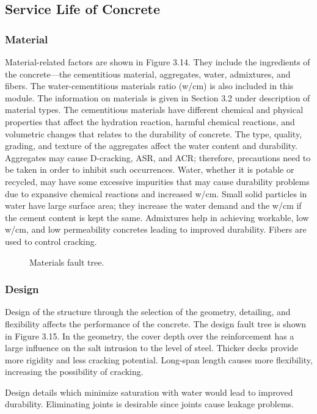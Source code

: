 \subsection{Service Life of Concrete}
\subsubsection{Material}
Material-related factors are shown in Figure 3.14. They include the ingredients of the concrete—the
cementitious material, aggregates, water, admixtures, and fibers. The water-cementitious materials ratio (w/cm) is
also included in this module. The information on materials is given in Section 3.2 under description of material
types. The cementitious materials have different chemical and physical properties that affect the hydration reaction,
harmful chemical reactions, and volumetric changes that relates to the durability of concrete. The type, quality,
grading, and texture of the aggregates affect the water content and durability. Aggregates may cause D-cracking,
ASR, and ACR; therefore, precautions need to be taken in order to inhibit such occurrences. Water, whether it is
potable or recycled, may have some excessive impurities that may cause durability problems due to expansive
chemical reactions and increased w/cm. Small solid particles in water have large surface area; they increase the water demand and the w/cm if the cement content is kept the same. Admixtures help in achieving workable, low w/cm, and
low permeability concretes leading to improved durability. Fibers are used to control cracking.

\begin{figure}
  \caption{Materials fault tree.}\label{fig:fault-tree-material}
\end{figure}

\subsubsection{Design}
Design of the structure through the selection of the geometry, detailing, and flexibility affects the performance of
the concrete. The design fault tree is shown in Figure 3.15. In the geometry, the cover depth over the reinforcement
has a large influence on the salt intrusion to the level of steel. Thicker decks provide more rigidity and less cracking
potential. Long-span length causes more flexibility, increasing the possibility of cracking.

Design details which minimize saturation with water would lead to improved durability. Eliminating joints is
desirable since joints cause leakage problems.

